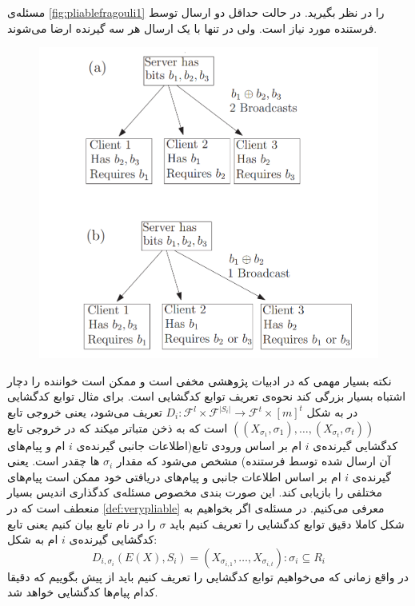 \begin{remark}
مسئله‌ی 
\autoref{fig:pliablefragouli1}
را در نظر بگیرید. در حالت 
\icod
 حداقل دو ارسال توسط فرستنده مورد نیاز است. ولی در
 \picod
 تنها با یک ارسال هر سه گیرنده ارضا می‌شوند.
 \begin{figure}[H]
 	\centering
 	\includegraphics[width=0.6\linewidth]{figs/ch3/pliable_fragouli1}
 	\caption[
 	تفاوت
 	\icod
 	و
 	\picod
 	]{\cite{pliablefirstpaper}}
 	\label{fig:pliablefragouli1}
 \end{figure}
\end{remark}

\begin{remark}
	نکته بسیار مهمی که در ادبیات پژوهشی 
	\picod
	مخفی است و ممکن است خواننده را دچار اشتباه بسیار بزرگی کند نحوه‌ی تعریف توابع کدگشایی است. برای مثال توابع کدگشایی در
	\cite{song2017polynomialtime}
	به شکل
	$D_i: \mathcal{F}^l \times \mathcal{F}^{|S_i|} \rightarrow \mathcal{F}^t \times [m]^t$
	تعریف می‌شود، یعنی خروجی تابع
	$((X_{\sigma_1}, \sigma_1), \ldots, (X_{\sigma_t}, \sigma_t) )$
	است که به ذخن متباتر میکند که در خروجی تابع کدگشایی گیرنده‌ی 
	$i$
	ام بر اساس ورودی تابع(اطلاعات جانبی گیرنده‌ی 
	$i$
	ام و پیام‌های آن ارسال شده توسط فرستنده) مشخص می‌شود که مقدار
	$\sigma_i$
	ها چقدر است. یعنی گیرنده‌ی
	$i$
	ام بر اساس اطلاعات جانبی و پیام‌های دریافتی خود ممکن است پیام‌های مختلفی را بازیابی کند. این صورت بندی مخصوص مسئله‌ی کدگذاری اندیس بسیار منعطف است که در
	\autoref{def:verypliable}
	معرفی می‌کنیم. در مسئله‌ی
	\picod
	اگر بخواهیم به شکل کاملا دقیق توابع کدگشایی را تعریف کنیم باید 
	$\sigma$
	 را در نام تابع بیان کنیم یعنی تابع کدگشایی گیرنده‌ی
	 $i$
	 ام به شکل:
	 	$$D_{i, \sigma_i}(E(X), S_i) = (X_{\sigma_{i,1}}, \ldots, X_{\sigma_{i,t}}): \sigma_i \subseteq R_i $$
	 	در واقع زمانی که می‌خواهیم توابع کدگشایی را تعریف کنیم باید از پیش بگوییم که دقیقا کدام پیام‌ها کدگشایی خواهد شد.
\end{remark}

